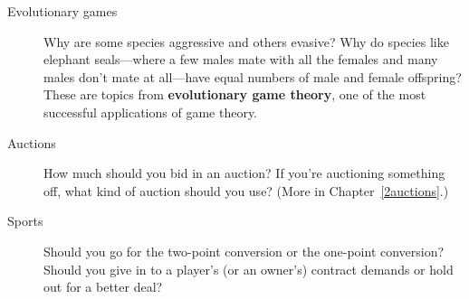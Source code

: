 \begin{description}





\item[Evolutionary games\index{evolution!game theory applied to}] Why are some species aggressive and others evasive? Why do species like elephant seals---where a few males mate with all the females and many males don't mate at all---have equal numbers of male and female offspring? These are topics from  \textbf{evolutionary game theory}, one of the most successful applications of game theory.


\item[Auctions\index{auction}] How much should you bid in an auction? If you're auctioning something off, what kind of auction should you use? (More in Chapter~\ref{2auctions}.)

\item[Sports\index{sports!game theory applied to}] Should you go for the two-point conversion or the one-point conversion? Should you give in to a player's (or an owner's) contract demands or hold out for a better deal?


\end{description}
